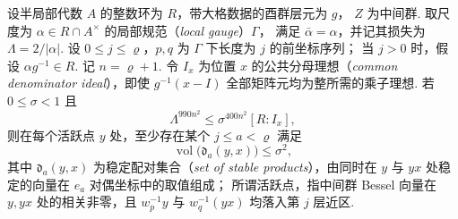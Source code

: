 \begin{lemma}[分母理想与稳定配对的深度]
\label{lem:b-ideal-depth}
\emitthmsource
设半局部代数 $A$ 的整数环为 $R$，带大格数据的酉群层元为 $g$，
$Z$ 为中间群. 取尺度为 $\alpha\in R\cap A^\times$ 的局部规范（\emph{local gauge}）$\Gamma$，
满足 $\bar\alpha=\alpha$，并记其损失为 $\Lambda=2/|\alpha|$.
设 $0\le j\le\varrho$，$p,q$ 为 $\Gamma$ 下长度为 $j$ 的前坐标序列；
当 $j>0$ 时，假设 $\alpha g^{-1}\in R$. 记 $n=\varrho+1$.
令 $I_x$ 为位置 $x$ 的公共分母理想（\emph{common denominator ideal}），即使 $g^{-1}(x-I)$ 全部矩阵元均为整所需的乘子理想.
若 $0\le\sigma<1$ 且
\[
  \Lambda^{990n^2}\le \sigma^{400n^2}[R:I_x],
\]
则在每个活跃点 $y$ 处，至少存在某个 $j\le a<\varrho$ 满足
\[
  \operatorname{vol}\bigl(\mathfrak d_a(y,x)\bigr)\le \sigma^2,
\]
其中 $\mathfrak d_a(y,x)$ 为稳定配对集合（\emph{set of stable products}），由同时在 $y$ 与 $yx$ 处稳定的向量在 $e_a$ 对偶坐标中的取值组成；
所谓活跃点，指中间群 Bessel 向量在 $y,yx$ 处的相关非零，且
$w_p^{-1}y$ 与 $w_q^{-1}(yx)$ 均落入第 $j$ 层近区.
\end{lemma}
